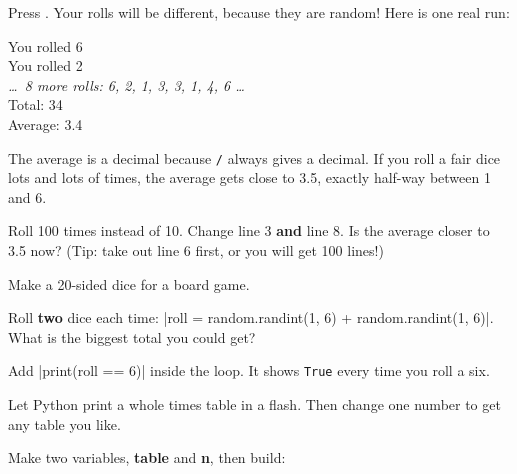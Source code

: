 Press \playbtn. Your rolls will be different, because they are random! Here is one real run:

\begin{outputbox}
You rolled 6\\
You rolled 2\\
{\sffamily\itshape\color{muted} \ldots\ 8 more rolls: 6, 2, 1, 3, 3, 1, 4, 6 \ldots}\\
Total: 34\\
Average: 3.4
\end{outputbox}

The average is a decimal because \texttt{/} always gives a decimal. If you roll a fair dice lots and lots of times, the average gets close to 3.5, exactly half-way between 1 and 6.

\begin{challenge}
\tick Roll 100 times instead of 10. Change line 3 \textbf{and} line 8. Is the average closer to 3.5 now? (Tip: take out line 6 first, or you will get 100 lines!)\par
\tick Make a 20-sided dice for a board game.\par
\tick Roll \textbf{two} dice each time: \py|roll = random.randint(1, 6) + random.randint(1, 6)|. What is the biggest total you could get?\par
\tick Add \py|print(roll == 6)| inside the loop. It shows \texttt{True} every time you roll a six.
\end{challenge}


Let Python print a whole times table in a flash. Then change one number to get any table you like.

Make two variables, \textbf{table} and \textbf{n}, then build:

\begin{center}
\begin{scratch}
\end{scratch}
\end{center}

